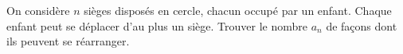 On considère $n$ sièges disposés en cercle, chacun occupé par un enfant. Chaque enfant peut se déplacer d'au plus un siège. Trouver le nombre $a_n$ de façons dont ils peuvent se réarranger.
